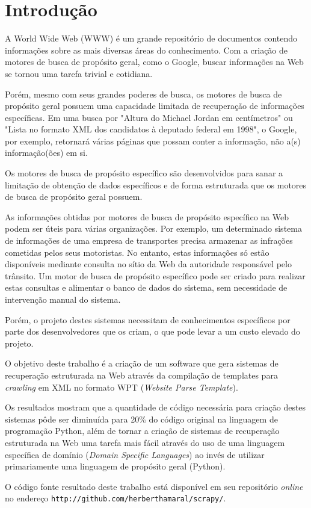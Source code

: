 \chapter{Introdução}

A World Wide Web (WWW) é um grande repositório de documentos contendo informações sobre as mais diversas áreas do conhecimento. Com a criação de motores de busca de propósito geral, como o Google, buscar informações na Web se tornou uma tarefa trivial e cotidiana.

Porém, mesmo com seus grandes poderes de busca, os motores de busca de propósito geral possuem uma capacidade limitada de recuperação de informações específicas. Em uma busca por "Altura do Michael Jordan em centímetros" ou "Lista no formato XML dos candidatos à deputado federal em 1998", o Google, por exemplo, retornará várias páginas que possam conter a informação, não a(s) informação(ões) em si.

Os motores de busca de propósito específico são desenvolvidos para sanar a limitação de obtenção de dados específicos e de forma estruturada que os motores de busca de propósito geral possuem.

As informações obtidas por motores de busca de propósito específico na Web podem ser úteis para várias organizações. Por exemplo, um determinado sistema de informações de uma empresa de transportes precisa armazenar as infrações cometidas pelos seus motoristas. No entanto, estas informações só estão disponíveis mediante consulta no sítio da Web da autoridade responsável pelo trânsito. Um motor de busca de propósito específico pode ser criado para realizar estas consultas e alimentar o banco de dados do sistema, sem necessidade de intervenção manual do sistema.

Porém, o projeto destes sistemas necessitam de conhecimentos específicos por parte dos desenvolvedores que os criam, o que pode levar a um custo elevado do projeto.

O objetivo deste trabalho é a criação de um software que gera sistemas de recuperação estruturada na Web através da compilação de templates para \emph{crawling} em XML no formato WPT (\emph{Website Parse Template}).

Os resultados mostram que a quantidade de código necessária para criação destes sistemas pôde ser diminuída para 20\% do código original na linguagem de programação Python, além de tornar a criação de sistemas de recuperação estruturada na Web uma tarefa mais fácil através do uso de uma linguagem específica de domínio (\emph{Domain Specific Languages}) ao invés de utilizar primariamente uma linguagem de propósito geral (Python).

O código fonte resultado deste trabalho está disponível em seu repositório \emph{online} no endereço \texttt{http://github.com/herberthamaral/scrapy/}.